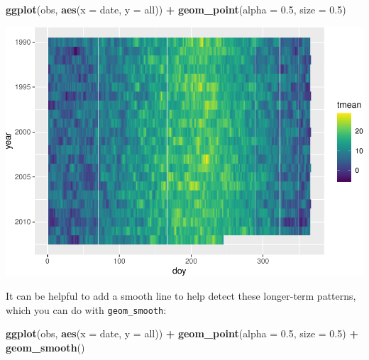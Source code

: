 \documentclass[
]{book}
\newenvironment{Shaded}{\begin{snugshade}}{\end{snugshade}}
\newcommand{\DataTypeTok}[1]{\textcolor[rgb]{0.13,0.29,0.53}{#1}}
\newcommand{\FloatTok}[1]{\textcolor[rgb]{0.00,0.00,0.81}{#1}}
\newcommand{\KeywordTok}[1]{\textcolor[rgb]{0.13,0.29,0.53}{\textbf{#1}}}
\newcommand{\NormalTok}[1]{#1}
\newcommand{\OperatorTok}[1]{\textcolor[rgb]{0.81,0.36,0.00}{\textbf{#1}}}
\newcommand{\StringTok}[1]{\textcolor[rgb]{0.31,0.60,0.02}{#1}}
\begin{document}
\begin{Shaded}
\begin{Highlighting}[]
\KeywordTok{ggplot}\NormalTok{(obs, }\KeywordTok{aes}\NormalTok{(}\DataTypeTok{x =}\NormalTok{ date, }\DataTypeTok{y =}\NormalTok{ all)) }\OperatorTok{+}\StringTok{ }
\StringTok{  }\KeywordTok{geom_point}\NormalTok{(}\DataTypeTok{alpha =} \FloatTok{0.5}\NormalTok{, }\DataTypeTok{size =} \FloatTok{0.5}\NormalTok{)}
\end{Highlighting}
\end{Shaded}

\includegraphics{adv_epi_analysis_files/figure-latex/unnamed-chunk-12-1.pdf}

It can be helpful to add a smooth line to help detect these longer-term
patterns, which you can do with \texttt{geom\_smooth}:

\begin{Shaded}
\begin{Highlighting}[]
\KeywordTok{ggplot}\NormalTok{(obs, }\KeywordTok{aes}\NormalTok{(}\DataTypeTok{x =}\NormalTok{ date, }\DataTypeTok{y =}\NormalTok{ all)) }\OperatorTok{+}\StringTok{ }
\StringTok{  }\KeywordTok{geom_point}\NormalTok{(}\DataTypeTok{alpha =} \FloatTok{0.5}\NormalTok{, }\DataTypeTok{size =} \FloatTok{0.5}\NormalTok{) }\OperatorTok{+}\StringTok{ }
\StringTok{  }\KeywordTok{geom_smooth}\NormalTok{()}
\end{Highlighting}
\end{Shaded}
\end{document}
